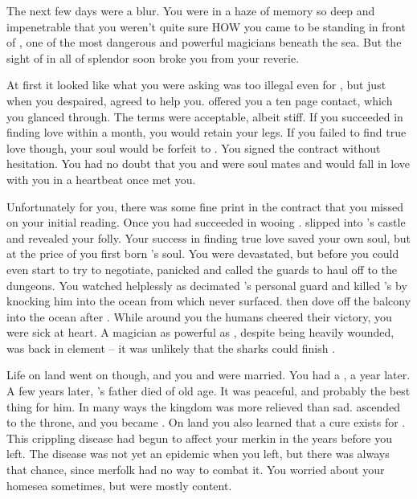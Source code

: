 \documentclass[char]{NeptuneBall}
\begin{document}
The next few days were a blur. You were in a haze of memory so deep and impenetrable that you weren't quite sure HOW you came to be standing in front of \cWitch{}, one of the most dangerous and powerful magicians beneath the sea. But the sight of \cWitch{\them} in all of \cWitch{\their} splendor soon broke you from your reverie.

At first it looked like what you were asking was too illegal even for \cWitch{}, but just when you despaired, \cWitch{\they} agreed to help you. \cWitch{} offered you a ten page contact, which you glanced through. The terms were acceptable, albeit stiff. If you succeeded in finding love within a month, you would retain your legs. If you failed to find true love though, your soul would be forfeit to \cWitch{}. You signed the contract without hesitation. You had no doubt that you and \cEric{} were soul mates and \cEric{\they} would fall in love with you in a heartbeat once \cEric{} met you.

Unfortunately for you, there was some fine print in the contract that you missed on your initial reading. Once you had succeeded in wooing \cEric{}. \cWitch{} slipped into \cEric{}'s castle and revealed your folly. Your success in finding true love saved your own soul, but at the price of you first born \cArielsSon{\offspring}'s soul. You were devastated, but before you could even start to try to negotiate, \cEric{} panicked and called the guards to haul \cWitch{} off to the dungeons. You watched helplessly as \cWitch{} decimated \cEric{}'s personal guard and killed \cEric{}'s \cPrince{\sibling} \cSlave{} by knocking him into the ocean from which \cSlave{\they} never surfaced. \cWitch{} then dove off the balcony into the ocean after \cSlave{\them}. While around you the humans cheered their victory, you were sick at heart. A magician as powerful as \cWitch{}, despite being heavily wounded, was back in \cWitch{\them} element -- it was unlikely that the sharks could finish \cWitch{\them}.

Life on land went on though, and you and \cEric{} were married. You had a \cWillow{\offspring}, \cWillow{} a year later. A few years later, \cEric{}'s father died of old age. It was peaceful, and probably the best thing for him. In many ways the kingdom was more relieved than sad. \cEric{} ascended to the throne, and you became \cAriel{\King}. On land you also learned that a cure exists for \cPolio{}. This crippling disease had begun to affect your merkin in the years before you left. The disease was not yet an epidemic when you left, but there was always that chance, since merfolk had no way to combat it. You worried about your homesea sometimes, but were mostly content.
\end{document}
